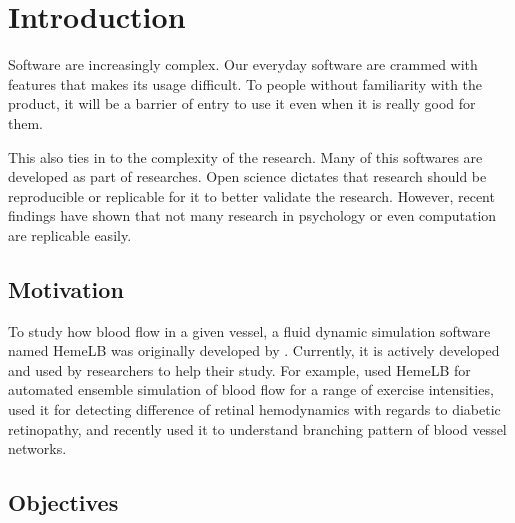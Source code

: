  

\chapter[Introduction]{Introduction}
Software are increasingly complex. Our everyday software are crammed with features that makes its usage difficult. To people without familiarity with the product, it will be a barrier of entry to use it even when it is really good for them.

This also ties in to the complexity of the research. Many of this softwares are developed as part of researches. Open science dictates that research should be reproducible or replicable for it to better validate the research. However, recent findings have shown that not many research in psychology or even computation are replicable easily.  


\section{Motivation}
To study how blood flow in a given vessel, a fluid dynamic simulation software named HemeLB was originally developed by \cite{mazzeo2008hemelb}. Currently, it is actively developed and used by researchers to help their study. For example, \cite{itani2015automated} used HemeLB for automated ensemble simulation of blood flow for a range of exercise intensities,  \cite{bernabeu2015characterization} used it for detecting difference of retinal hemodynamics with regards to diabetic retinopathy, and recently \cite{franco2015dynamic,franco2016non} used it to understand branching pattern of blood vessel networks.

\section{Objectives}


